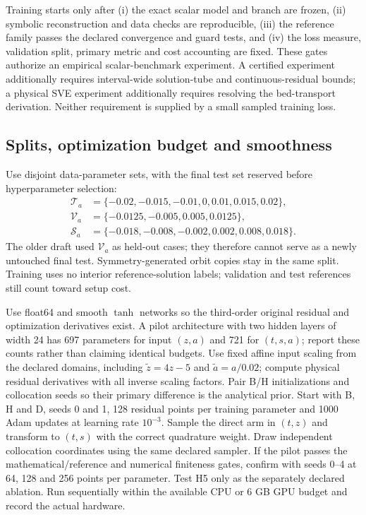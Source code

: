 Training starts only after (i) the exact scalar model and branch are frozen,
(ii) symbolic reconstruction and data checks are reproducible,
(iii) the reference family passes the declared convergence and guard tests,
and (iv) the loss measure, validation split, primary metric and cost
accounting are fixed. These gates authorize an empirical scalar-benchmark
experiment. A certified experiment additionally requires interval-wide
solution-tube and continuous-residual bounds; a physical SVE experiment
additionally requires resolving the bed-transport derivation. Neither
requirement is supplied by a small sampled training loss.

\subsection{Splits, optimization budget and smoothness}
Use disjoint data-parameter sets, with the final test set reserved before
hyperparameter selection:
\begin{align*}
 \mathcal T_a&=\{-0.02,-0.015,-0.01,0,0.01,0.015,0.02\},\\
 \mathcal V_a&=\{-0.0125,-0.005,0.005,0.0125\},\\
 \mathcal S_a&=\{-0.018,-0.008,-0.002,0.002,0.008,0.018\}.
\end{align*}
The older draft used $\mathcal V_a$ as held-out cases; they therefore cannot
serve as a newly untouched final test. Symmetry-generated orbit copies stay
in the same split. Training uses no interior reference-solution labels;
validation and test references still count toward setup cost.

Use float64 and smooth $\tanh$ networks so the third-order original residual
and optimization derivatives exist. A pilot architecture with two hidden
layers of width 24 has 697 parameters for input $(z,a)$ and 721 for
$(t,s,a)$; report these counts rather than claiming identical budgets.
Use fixed affine input scaling from the declared domains, including
$\widetilde z=4z-5$ and $\widetilde a=a/0.02$; compute physical residual
derivatives with all inverse scaling factors. Pair B/H initializations and
collocation seeds so their primary difference is the analytical prior.
Start with B, H and D, seeds 0 and 1, 128 residual points per training
parameter and 1000 Adam updates at learning rate $10^{-3}$. Sample the
direct arm in $(t,z)$ and transform to $(t,s)$ with the correct quadrature
weight. Draw independent collocation coordinates using the same declared
sampler. If the pilot passes the mathematical/reference and numerical
finiteness gates, confirm with seeds 0--4 at 64, 128 and 256 points per
parameter. Test H5 only as the separately declared ablation. Run sequentially
within the available CPU or 6 GB GPU budget and record the actual hardware.

